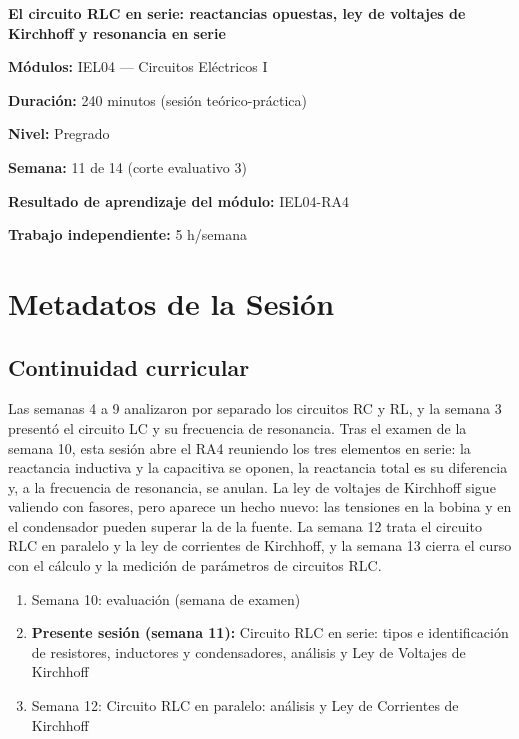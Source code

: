 \documentclass[11pt,letterpaper]{article}
\begin{document}
\begin{cabecera}
{\color{iubyellow}\Large\bfseries El circuito RLC en serie: reactancias opuestas, ley de voltajes de Kirchhoff y resonancia en serie\par}
\vspace{0.6em}
\small
\textbf{\color{iubyellow}Módulos:} IEL04 --- Circuitos Eléctricos I\par
\textbf{\color{iubyellow}Duración:} 240 minutos (sesión teórico-práctica)\par
\textbf{\color{iubyellow}Nivel:} Pregrado\par
\textbf{\color{iubyellow}Semana:} 11 de 14 (corte evaluativo 3)\par
\textbf{\color{iubyellow}Resultado de aprendizaje del módulo:} IEL04-RA4\par
\textbf{\color{iubyellow}Trabajo independiente:} 5 h/semana\par
\end{cabecera}

\section{Metadatos de la Sesión}

\subsection{Continuidad curricular}

Las semanas 4 a 9 analizaron por separado los circuitos RC y RL, y la semana 3 presentó el circuito LC y su frecuencia de resonancia. Tras el examen de la semana 10, esta sesión abre el RA4 reuniendo los tres elementos en serie: la reactancia inductiva y la capacitiva se oponen, la reactancia total es su diferencia y, a la frecuencia de resonancia, se anulan. La ley de voltajes de Kirchhoff sigue valiendo con fasores, pero aparece un hecho nuevo: las tensiones en la bobina y en el condensador pueden superar la de la fuente. La semana 12 trata el circuito RLC en paralelo y la ley de corrientes de Kirchhoff, y la semana 13 cierra el curso con el cálculo y la medición de parámetros de circuitos RLC.

\begin{enumerate}
  \item Semana 10: evaluación (semana de examen)
  \item \textbf{Presente sesión (semana 11):} Circuito RLC en serie: tipos e identificación de resistores, inductores y condensadores, análisis y Ley de Voltajes de Kirchhoff
  \item Semana 12: Circuito RLC en paralelo: análisis y Ley de Corrientes de Kirchhoff
\end{enumerate}
\end{document}
